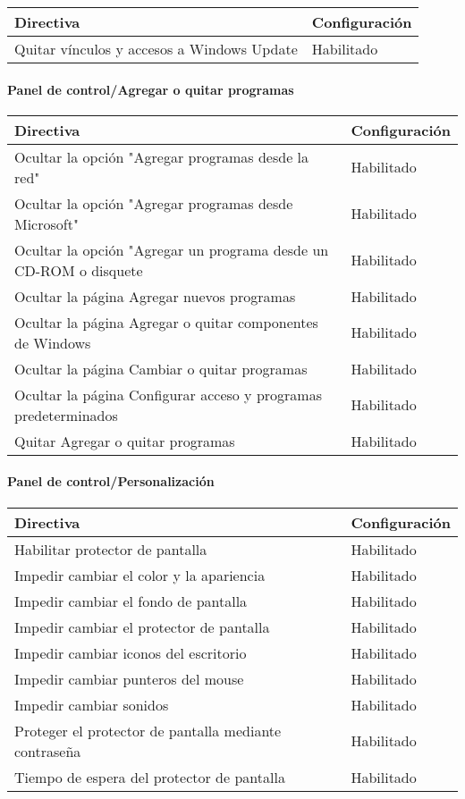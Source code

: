 \documentclass[
]{article}
\begin{document}
\begin{longtable}[]{@{}ll@{}}
\toprule
\textbf{Directiva} & \textbf{Configuración}\tabularnewline
\midrule
\endhead
Quitar vínculos y accesos a Windows Update & Habilitado\tabularnewline
\bottomrule
\end{longtable}

\hypertarget{panel-de-controlagregar-o-quitar-programas}{%
\paragraph{Panel de control/Agregar o quitar
programas}\label{panel-de-controlagregar-o-quitar-programas}}

\begin{longtable}[]{@{}ll@{}}
\toprule
\textbf{Directiva} & \textbf{Configuración}\tabularnewline
\midrule
\endhead
Ocultar la opción "Agregar programas desde la red" &
Habilitado\tabularnewline
Ocultar la opción "Agregar programas desde Microsoft" &
Habilitado\tabularnewline
Ocultar la opción "Agregar un programa desde un CD-ROM o disquete &
Habilitado\tabularnewline
Ocultar la página Agregar nuevos programas & Habilitado\tabularnewline
Ocultar la página Agregar o quitar componentes de Windows &
Habilitado\tabularnewline
Ocultar la página Cambiar o quitar programas & Habilitado\tabularnewline
Ocultar la página Configurar acceso y programas predeterminados &
Habilitado\tabularnewline
Quitar Agregar o quitar programas & Habilitado\tabularnewline
\bottomrule
\end{longtable}

\hypertarget{panel-de-controlpersonalizaciuxf3n}{%
\paragraph{Panel de
control/Personalización}\label{panel-de-controlpersonalizaciuxf3n}}

\begin{longtable}[]{@{}ll@{}}
\toprule
\textbf{Directiva} & \textbf{Configuración}\tabularnewline
\midrule
\endhead
Habilitar protector de pantalla & Habilitado\tabularnewline
Impedir cambiar el color y la apariencia & Habilitado\tabularnewline
Impedir cambiar el fondo de pantalla & Habilitado\tabularnewline
Impedir cambiar el protector de pantalla & Habilitado\tabularnewline
Impedir cambiar iconos del escritorio & Habilitado\tabularnewline
Impedir cambiar punteros del mouse & Habilitado\tabularnewline
Impedir cambiar sonidos & Habilitado\tabularnewline
Proteger el protector de pantalla mediante contraseña &
Habilitado\tabularnewline
Tiempo de espera del protector de pantalla & Habilitado\tabularnewline
\bottomrule
\end{longtable}
\end{document}
